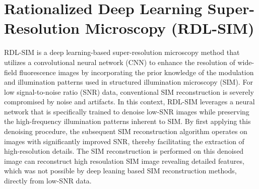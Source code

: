 \documentclass[11pt,
  paper=a4, 
  bibliography=totocnumbered,
	captions=tableheading,
	BCOR=10mm
]{scrreprt}
\theoremstyle{definition}
\begin{document}

\section{Rationalized Deep Learning Super-Resolution Microscopy (RDL-SIM)}
\label{sec:rdl-sim}
RDL-SIM is a deep learning-based super-resolution microscopy method that utilizes a convolutional neural network (CNN) to enhance the resolution of wide-field fluorescence 
images by incorporating the prior knowledge of the modulation and illumination patterns used in structured illumination microscopy (SIM).
For low signal-to-noise ratio (SNR) data, conventional SIM reconstruction is severely compromised by noise and artifacts. In this context, RDL-SIM leverages a neural network that 
is specifically trained to denoise low-SNR images while preserving the high-frequency illumination patterns inherent to SIM. By first applying this denoising procedure,
the subsequent SIM reconstruction algorithm operates on images with significantly improved SNR, thereby facilitating the extraction of high-resolution details.
The SIM reconstruction is performed on this denoised image can reconstruct high resoulation SIM image revealing detailed features, which was not possible by 
deep leaning based SIM reconstruction methods, directly from low-SNR data. \cite{rdl_main}
\end{document}

